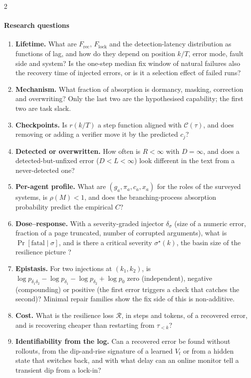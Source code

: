 \begin{multicols}{2}
\paragraph{Research questions}
\begin{enumerate}[leftmargin=1.4em,itemsep=1pt]
\item \textbf{Lifetime.} What are $F_{\mathrm{rec}}$, $F_{\mathrm{lock}}$ and the detection-latency distribution as functions of lag, and how do they depend on position $k/T$, error mode, fault side and system? Is the one-step median fix window of natural failures also the recovery time of injected errors, or is it a selection effect of failed runs?
\item \textbf{Mechanism.} What fraction of absorption is dormancy, masking, correction and overwriting? Only the last two are the hypothesised capability; the first two are task slack.
\item \textbf{Checkpoints.} Is $r(k/T)$ a step function aligned with $\mathcal{C}(\tau)$, and does removing or adding a verifier move it by the predicted $c_j$?
\item \textbf{Detected or overwritten.} How often is $R<\infty$ with $D=\infty$, and does a detected-but-unfixed error ($D<L<\infty$) look different in the text from a never-detected one?
\item \textbf{Per-agent profile.} What are $(g_a,\pi_a,c_a,x_a)$ for the roles of the surveyed systems, is $\rho(M)<1$, and does the branching-process absorption probability predict the empirical $C$?
\item \textbf{Dose--response.} With a severity-graded injector $\delta_\sigma$ (size of a numeric error, fraction of a page truncated, number of corrupted arguments), what is $\Pr[\text{fatal}\mid\sigma]$, and is there a critical severity $\sigma^\star(k)$, the basin size of the resilience picture \cite{holling1973resilience}?
\item \textbf{Epistasis.} For two injections at $(k_1,k_2)$, is $\log p_{\delta_1\delta_2}-\log p_{\delta_1}-\log p_{\delta_2}+\log p_0$ zero (independent), negative (compounding) or positive (the first error triggers a check that catches the second)? Minimal repair families \cite{li2026mrfr} show the fix side of this is non-additive.
\item \textbf{Cost.} What is the resilience loss $\mathcal{R}$, in steps and tokens, of a recovered error, and is recovering cheaper than restarting from $\tau_{<k}$?
\item \textbf{Identifiability from the log.} Can a recovered error be found without rollouts, from the dip-and-rise signature of a learned $V_t$ or from a hidden state that switches back, and with what delay can an online monitor tell a transient dip from a lock-in?
\end{enumerate}


\end{multicols}
